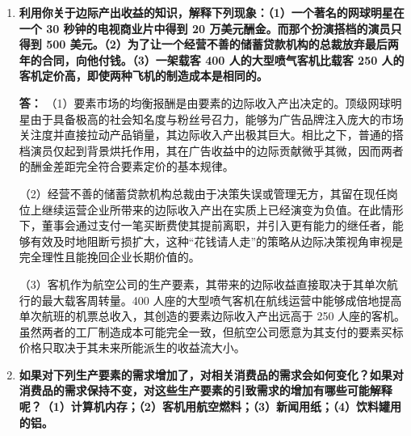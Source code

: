 \begin{enumerate}[label=\textbf{\arabic*.}, leftmargin=*]
\begin{center}
		\end{center}
		
		\item \textbf{利用你关于边际产出收益的知识，解释下列现象：（1）一个著名的网球明星在一个 30 秒钟的电视商业片中得到 20 万美元酬金。而那个扮演搭档的演员只得到 500 美元。（2）为了让一个经营不善的储蓄贷款机构的总裁放弃最后两年的合同，向他付钱。（3）一架载客 400 人的大型喷气客机比载客 250 人的客机定价高，即使两种飞机的制造成本是相同的。}
		
		\textbf{答：}
		（1）要素市场的均衡报酬是由要素的边际收入产出决定的。顶级网球明星由于具备极高的社会知名度与粉丝号召力，能够为广告品牌注入庞大的市场关注度并直接拉动产品销量，其边际收入产出极其巨大。相比之下，普通的搭档演员仅起到背景烘托作用，其在广告收益中的边际贡献微乎其微，因而两者的酬金差距完全符合要素定价的基本规律。
		
		（2）经营不善的储蓄贷款机构总裁由于决策失误或管理无方，其留在现任岗位上继续运营企业所带来的边际收入产出在实质上已经演变为负值。在此情形下，董事会通过支付一笔买断费使其提前离职，并引入更有能力的继任者，能够有效及时地阻断亏损扩大，这种“花钱请人走”的策略从边际决策视角审视是完全理性且能挽回企业长期价值的。
		
		（3）客机作为航空公司的生产要素，其带来的边际收益直接取决于其单次航行的最大载客周转量。400 人座的大型喷气客机在航线运营中能够成倍地提高单次航班的机票总收入，其创造的要素边际收入产出远高于 250 人座的客机。虽然两者的工厂制造成本可能完全一致，但航空公司愿意为其支付的要素买标价格只取决于其未来所能派生的收益流大小。
		
		\item \textbf{如果对下列生产要素的需求增加了，对相关消费品的需求会如何变化？如果对消费品的需求保持不变，对这些生产要素的引致需求的增加有哪些可能解释呢？（1）计算机内存；（2）客机用航空燃料；（3）新闻用纸；（4）饮料罐用的铝。}
		

\end{enumerate}
